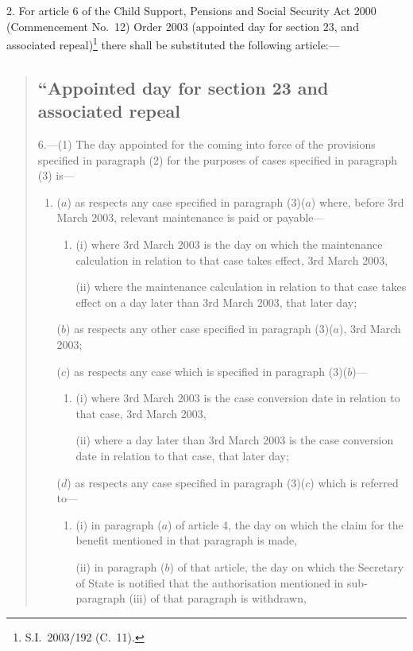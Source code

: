 \documentclass[12pt,a4paper]{article}
\begin{document}
2.  For article 6 of the Child Support, Pensions and Social Security Act 2000 (Commencement No.\ 12) Order 2003 (appointed day for section 23, and associated repeal)\footnote{S.I.\ 2003/192 (C.\ 11).} there shall be substituted the following article:—
\begin{quotation}
\subsection*{“Appointed day for section 23 and associated repeal}

6.---(1)  The day appointed for the coming into force of the provisions specified in paragraph (2) for the purposes of cases specified in paragraph (3) is—
\begin{enumerate}\item[]
($a$) as respects any case specified in paragraph (3)($a$)  where, before 3rd March 2003, relevant maintenance is paid or payable—
\begin{enumerate}\item[]
(i) where 3rd March 2003 is the day on which the maintenance calculation in relation to that case takes effect, 3rd March 2003,

(ii) where the maintenance calculation in relation to that case takes effect on a day later than 3rd March 2003, that later day;
\end{enumerate}

($b$) as respects any other case specified in paragraph (3)($a$), 3rd March 2003;

($c$) as respects any case which is specified in paragraph (3)($b$)—
\begin{enumerate}\item[]
(i) where 3rd March 2003 is the case conversion date in relation to that case, 3rd March 2003,

(ii) where a day later than 3rd March 2003 is the case conversion date in relation to that case, that later day;
\end{enumerate}

($d$) as respects any case specified in paragraph (3)($c$)  which is referred to—
\begin{enumerate}\item[]
(i) in paragraph ($a$)  of article 4, the day on which the claim for the benefit mentioned in that paragraph is made,

(ii) in paragraph ($b$)  of that article, the day on which the Secretary of State is notified that the authorisation mentioned in sub-paragraph (iii)  of that paragraph is withdrawn,


\end{enumerate}
\end{enumerate}
\end{quotation}
\end{document}
